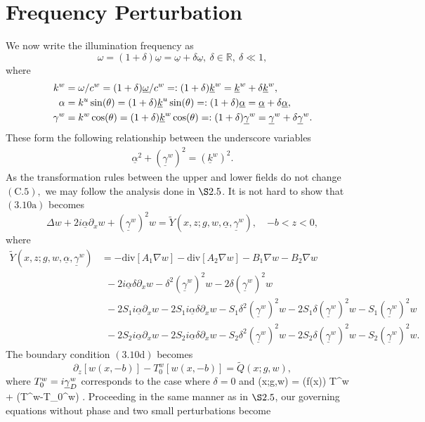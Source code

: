 \section{Frequency Perturbation}
\label{intro:frequency_perturbation in lower field}

We now write the illumination frequency as
\begin{equation}\omega=(1+\delta)\underline{\omega}=\underline{\omega}+\delta\underline{\omega},~\delta\in\mathbb R, ~ \delta \ll 1,\end{equation}
where
\begin{subequations}
\begin{align} 
k^w & = \omega/c^w = (1 + \delta) \underline{\omega}/c^w 
  =: (1 + \delta) \underline{k}^w = \underline{k}^w + \delta \underline{k}^w,\\
\alpha & = k^u \sin(\theta) = (1 + \delta) \underline{k}^u \sin(\theta)
  =: (1 + \delta) \underline{\alpha} = \underline{\alpha} + \delta \underline{\alpha},\\
\gamma^w & = k^w \cos(\theta) = (1 + \delta) \underline{k}^w \cos(\theta)
  =: (1 + \delta) \underline{\gamma}^w = \underline{\gamma}^w + \delta \underline{\gamma}^w.
\end{align}
\end{subequations}
These form the following relationship between the underscore variables
\begin{align} 
\underline{\alpha}^2 + (\underline{\gamma}^w)^2 = (\underline{k}^w)^2.
\end{align}
As the transformation rules between the upper and lower fields do not change $(\text{C}.5),$ we may follow the analysis done in $\S2.5$. It is not hard to show that $(3.10\text{a})$ becomes 
\begin{equation}\Delta w +2i\underline{\alpha}\partial_{x}w+(\underline{\gamma}^w)^2w=\tilde{Y}\left(x,z;g,w,\underline{\alpha},\underline{\gamma}^w\right),\quad\text{$-b<z<0$}, \end{equation}
where
\begin{align*}\tilde{Y}\left(x,z;g,w,\underline{\alpha},\underline{\gamma}^w\right)&=-\text{div}[A_1\nabla w]-\text{div}[A_2\nabla w]-B_1\nabla w - B_2\nabla w\nonumber
\\&~~-2i\underline{\alpha}\delta\partial_xw-\delta^2(\underline{\gamma}^w)^2w-2\delta(\underline{\gamma}^w)^2w\nonumber
\\&~~-2S_1i\underline{\alpha}\partial_xw-2S_1i\underline{\alpha}\delta\partial_xw-S_1\delta^2(\underline{\gamma}^w)^2w-2S_1\delta(\underline{\gamma}^w)^2w-S_1(\underline{\gamma}^w)^2w\nonumber
\\&~~-2S_2i\underline{\alpha}\partial_xw-2S_2i\underline{\alpha}\delta\partial_xw-S_2\delta^2(\underline{\gamma}^w)^2w-2S_2\delta(\underline{\gamma}^w)^2w-S_2(\underline{\gamma}^w)^2w.
\end{align*}
The boundary condition $(3.10\text{d})$ becomes
$$\partial_z \left[w(x,-b)\right] - T_0^w[w(x,-b)]=\tilde{Q}(x;g,w),$$
where $T_0^w = i \underline{\gamma}_D^w$
corresponds to the case where $\delta=0$ and
\bes
{}(x;g,w) =  (\Eps f(x)) T^w \left[ w(x,-b) \right]
+ (T^w-T_0^w) \left[ w(x,-b) \right].
\ees
Proceeding in the same manner as in $\S2.5$, our governing equations without phase and two small perturbations become

